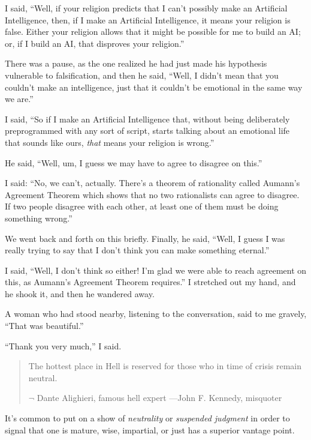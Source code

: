 {
 I said, ``Well, if your religion predicts that I
can't possibly make an Artificial Intelligence, then,
if I make an Artificial Intelligence, it means your religion is false.
Either your religion allows that it might be possible for me to build
an AI; or, if I build an AI, that disproves your
religion.''}

{
 There was a pause, as the one realized he had just made his
hypothesis vulnerable to falsification, and then he said,
``Well, I didn't mean that you
couldn't make an intelligence, just that it
couldn't be emotional in the same way we
are.''}

{
 I said, ``So if I make an Artificial Intelligence
that, without being deliberately preprogrammed with any sort of script,
starts talking about an emotional life that sounds like ours,
\textit{that} means your religion is wrong.''}

{
 He said, ``Well, um, I guess we may have to agree
to disagree on this.''}

{
 I said: ``No, we can't, actually.
There's a theorem of rationality called
Aumann's Agreement Theorem which shows that no two
rationalists can agree to disagree. If two people disagree with each
other, at least one of them must be doing something
wrong.''}

{
 We went back and forth on this briefly. Finally, he said,
``Well, I guess I was really trying to say that I
don't think you can make something
eternal.''}

{
 I said, ``Well, I don't think so
either! I'm glad we were able to reach agreement on
this, as Aumann's Agreement Theorem
requires.'' I stretched out my hand, and he shook it,
and then he wandered away.}

{
 A woman who had stood nearby, listening to the conversation, said
to me gravely, ``That was
beautiful.''}

{
 ``Thank you very much,'' I
said.}

\myendsectiontext


\begin{quote}
{
 The hottest place in Hell is reserved for those who in time of
crisis remain neutral.}

{\raggedleft
 $\lnot$ Dante Alighieri, famous hell expert\newline
---John F. Kennedy, misquoter
\par}
\end{quote}


{
 It's common to put on a show of
\textit{neutrality} or \textit{suspended judgment} in order to signal
that one is mature, wise, impartial, or just has a superior vantage
point.}

